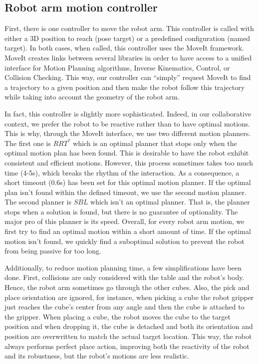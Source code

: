 \subsection{Robot arm motion controller}

First, there is one controller to move the robot arm. This controller is called with either a 3D position to reach (pose target) or a predefined configuration (named target). In both cases, when called, this controller uses the MoveIt framework. MoveIt creates links between several libraries in order to have access to a unified interface for Motion Planning algorithms, Inverse Kinematics, Control, or Collision Checking. This way, our controller can ``simply'' request MoveIt to find a trajectory to a given position and then make the robot follow this trajectory while taking into account the geometry of the robot arm.

In fact, this controller is slightly more sophisticated. Indeed, in our collaborative context, we prefer the robot to be reactive rather than to have optimal motions. This is why, through the MoveIt interface, we use two different motion planners. The first one is $RRT^*$ which is an optimal planner that stops only when the optimal motion plan has been found. This is desirable to have the robot exhibit consistent and efficient motions. However, this process sometimes takes too much time (4-5s), which breaks the rhythm of the interaction. As a consequence, a short timeout (0.6s) has been set for this optimal motion planner. If the optimal plan isn't found within the defined timeout, we use the second motion planner. 
The second planner is $SBL$ which isn't an optimal planner. That is, the planner stops when a solution is found, but there is no guarantee of optionality. The major pro of this planner is its speed.
Overall, for every robot arm motion, we first try to find an optimal motion within a short amount of time. If the optimal motion isn't found, we quickly find a suboptimal solution to prevent the robot from being passive for too long.

Additionally, to reduce motion planning time, a few simplifications have been done. 
First, collisions are only considered with the table and the robot's body. Hence, the robot arm sometimes go through the other cubes.
Also, the pick and place orientation are ignored, for instance, when picking a cube the robot gripper just reaches the cube's center from any angle and then the cube is attached to the gripper. When placing a cube, the robot moves the cube to the target position and when dropping it, the cube is detached and both its orientation and position are overwritten to match the actual target location. This way, the robot always performs perfect place action, improving both the reactivity of the robot and its robustness, but the robot's motions are less realistic.

